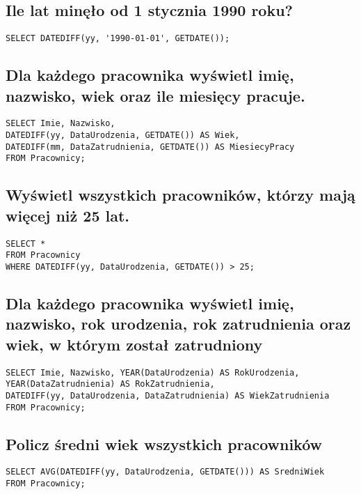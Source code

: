 \documentclass[a4paper]{article}
\begin{document}
\subsection{Ile lat minęło od 1 stycznia 1990 roku?}

\begin{verbatim}
SELECT DATEDIFF(yy, '1990-01-01', GETDATE());
\end{verbatim}

\subsection{Dla każdego pracownika wyświetl imię, nazwisko, wiek oraz ile miesięcy pracuje.}

\begin{verbatim}
SELECT Imie, Nazwisko,
DATEDIFF(yy, DataUrodzenia, GETDATE()) AS Wiek,
DATEDIFF(mm, DataZatrudnienia, GETDATE()) AS MiesiecyPracy
FROM Pracownicy;
\end{verbatim}

\subsection{Wyświetl wszystkich pracowników, którzy mają więcej niż 25 lat.}

\begin{verbatim}
SELECT *
FROM Pracownicy
WHERE DATEDIFF(yy, DataUrodzenia, GETDATE()) > 25;
\end{verbatim}

\subsection{Dla każdego pracownika wyświetl imię, nazwisko, rok urodzenia, rok zatrudnienia oraz wiek, w którym został zatrudniony}

\begin{verbatim}
SELECT Imie, Nazwisko, YEAR(DataUrodzenia) AS RokUrodzenia,
YEAR(DataZatrudnienia) AS RokZatrudnienia,
DATEDIFF(yy, DataUrodzenia, DataZatrudnienia) AS WiekZatrudnienia
FROM Pracownicy;
\end{verbatim}

\subsection{Policz średni wiek wszystkich pracowników}

\begin{verbatim}
SELECT AVG(DATEDIFF(yy, DataUrodzenia, GETDATE())) AS SredniWiek
FROM Pracownicy;
\end{verbatim}
\end{document}
